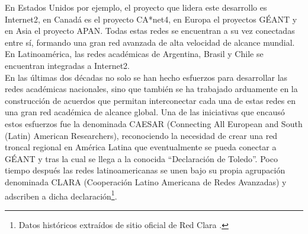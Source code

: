 En Estados Unidos por ejemplo, el proyecto que lidera este desarrollo es Internet2\citep{Internet2}, en Canadá es el proyecto CA*net4\citep{Canarie}, en Europa el proyectos GÉANT\citep{GEANT} y en Asia el proyecto APAN\citep{APAN}. Todas estas redes se encuentran a su vez conectadas entre sí, formando una gran red avanzada de alta velocidad de alcance mundial. En Latinoamérica, las redes académicas de Argentina, Brasil y Chile se encuentran integradas a Internet2.\\

En las \'ultimas dos d\'ecadas no solo se han hecho esfuerzos para desarrollar las redes académicas nacionales, sino que también se ha trabajado arduamente en la construcción de acuerdos que permitan interconectar cada una de estas redes en una gran red académica de alcance global. Una de las iniciativas que encaus\'o estos esfuerzos fue la denominada CAESAR (Connecting All European and South (Latin) American Researchers), reconociendo la necesidad de crear una red troncal regional en América Latina que eventualmente se pueda conectar a GÉANT y tras la cual se llega a la conocida “Declaración de Toledo”. Poco tiempo después las redes latinoamericanas se unen bajo su propia agrupación denominada CLARA (Cooperación Latino Americana de Redes Avanzadas) y adscriben a dicha declaración\footnote{Datos históricos extraídos de sitio oficial de Red Clara \cite{RedClara}.}.\\




